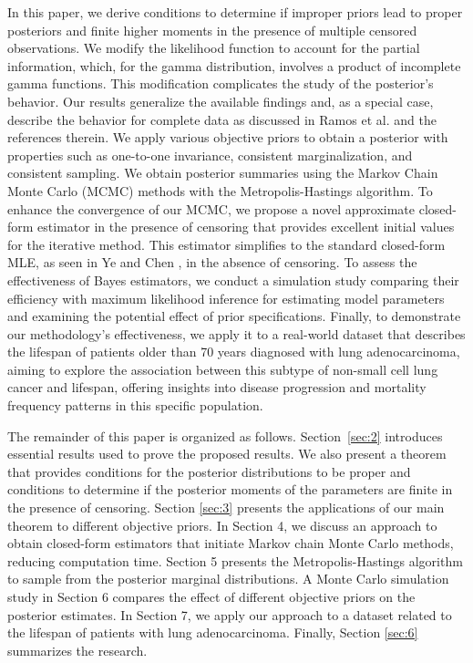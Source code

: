 \documentclass[]{interact}
\theoremstyle{plain}%
\theoremstyle{definition}
\theoremstyle{remark}
\begin{document}
In this paper, we derive conditions to determine if improper priors lead to proper posteriors and finite higher moments in the presence of multiple censored observations. We modify the likelihood function to account for the partial information, which, for the gamma distribution, involves a product of incomplete gamma functions. This modification complicates the study of the posterior's behavior. Our results generalize the available findings and, as a special case, describe the behavior for complete data as discussed in Ramos et al. \cite{ramos2021posterior} and the references therein. We apply various objective priors to obtain a posterior with properties such as one-to-one invariance, consistent marginalization, and consistent sampling. We obtain posterior summaries using the Markov Chain Monte Carlo (MCMC) methods with the Metropolis-Hastings algorithm. To enhance the convergence of our MCMC, we propose a novel approximate closed-form estimator in the presence of censoring that provides excellent initial values for the iterative method. This estimator simplifies to the standard closed-form MLE, as seen in Ye and Chen \cite{ye2017closed}, in the absence of censoring. To assess the effectiveness of Bayes estimators, we conduct a simulation study comparing their efficiency with maximum likelihood inference for estimating model parameters and examining the potential effect of prior specifications. Finally, to demonstrate our methodology's effectiveness, we apply it to a real-world dataset that describes the lifespan of patients older than 70 years diagnosed with lung adenocarcinoma, aiming to explore the association between this subtype of non-small cell lung cancer and lifespan, offering insights into disease progression and mortality frequency patterns in this specific population.

The remainder of this paper is organized as follows. Section~\ref{sec:2} introduces essential results used to prove the proposed results. We also present a theorem that provides conditions for the posterior distributions to be proper and conditions to determine if the posterior moments of the parameters are finite in the presence of censoring. Section \ref{sec:3} presents the applications of our main theorem to different objective priors. In Section 4, we discuss an approach to obtain closed-form estimators that initiate Markov chain Monte Carlo methods, reducing computation time. Section 5 presents the Metropolis-Hastings algorithm to sample from the posterior marginal distributions. A Monte Carlo simulation study in Section 6 compares the effect of different objective priors on the posterior estimates. In Section 7, we apply our approach to a dataset related to the lifespan of patients with lung adenocarcinoma. Finally, Section \ref{sec:6} summarizes the research.
\end{document}
